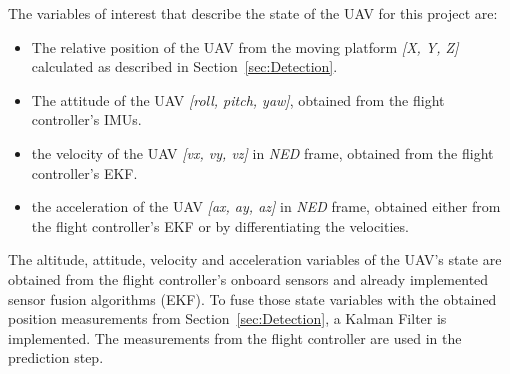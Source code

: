 \documentclass[conference, onecolumn, draftclsnofoot]{IEEEtran}
\begin{document}

The variables of interest that describe the state of the UAV for this project are:
%
\begin{itemize}

\item The relative position of the UAV from the moving platform \emph{[X, Y, Z]} 
calculated as described in Section~\ref{sec:Detection}.


\item The attitude of the UAV \emph{[roll, pitch, yaw]}, obtained from the flight controller's IMUs.

\item the velocity of the UAV \emph{[vx, vy, vz]} in \emph{NED} frame, obtained from 
the flight controller's EKF.


\item the acceleration of the UAV \emph{[ax, ay, az]} in \emph{NED} frame, obtained 
either from the flight controller's EKF or by differentiating the velocities.




\end{itemize}
%
The altitude, attitude, velocity and acceleration variables of the
UAV's state are obtained from the flight controller's onboard sensors
and already implemented sensor fusion algorithms (EKF). To fuse those
state variables with the obtained position measurements from
Section~\ref{sec:Detection}, a Kalman Filter is implemented. The
measurements from the flight controller are used in the prediction
step.
\end{document}
